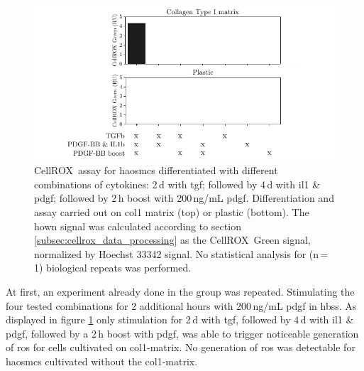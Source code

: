     \begin{figure}[h!]
    \capstart
        \centering
    	\includegraphics{Abbildung/CellROX_initial_cond.pdf}

    	\begin{minipage}{\captionwidth}
    		\caption[repeat_Lisa]{ \newline CellROX\texttrademark~assay for \acp{haosmc} differentiated with different combinations of cytokines: 2\,d with \ac{tgf}; followed by 4\,d with \ac{il1} \& \ac{pdgf}; followed by 2\,h boost with 200\,ng/mL \ac{pdgf}. Differentiation and assay carried out on \ac{col1} matrix (top) or plastic (bottom). The hown signal was calculated according to section \ref{subsec:cellrox_data_processing} as the CellROX\texttrademark~Green signal, normalized by Hoechst 33342 signal. No statistical analysis for (n\,=\,1) biological repeats was performed. }
    		\label{fig:cellrox_8con}
    	\end{minipage}
    \end{figure}

    At first, an experiment already done in the group was repeated. Stimulating the four tested combinations for 2 additional hours with 200\,ng/mL \ac{pdgf} in \ac{hbss}. As displayed in figure \ref{fig:cellrox_8con} only stimulation for 2\,d with \ac{tgf}, followed by 4\,d with \ac{il1} \& \ac{pdgf}, followed by a 2\,h boost with \ac{pdgf}, was able to trigger noticeable generation of \ac{ros} for cells cultivated on \ac{col1}-matrix. No generation of \ac{ros} was detectable for \acp{haosmc} cultivated without the \ac{col1}-matrix.

